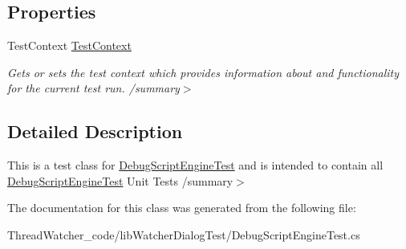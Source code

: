 \subsection*{Properties}
\begin{DoxyCompactItemize}
\item 
\hypertarget{classlib_watcher_dialog_test_1_1_debug_script_engine_test_ada71d963cf0149de6a70d39e3e203f13}{Test\+Context \hyperlink{classlib_watcher_dialog_test_1_1_debug_script_engine_test_ada71d963cf0149de6a70d39e3e203f13}{Test\+Context}}\label{classlib_watcher_dialog_test_1_1_debug_script_engine_test_ada71d963cf0149de6a70d39e3e203f13}

\begin{DoxyCompactList}\small\item\em Gets or sets the test context which provides information about and functionality for the current test run. /summary$>$ \end{DoxyCompactList}\end{DoxyCompactItemize}


\subsection{Detailed Description}
This is a test class for \hyperlink{classlib_watcher_dialog_test_1_1_debug_script_engine_test}{Debug\+Script\+Engine\+Test} and is intended to contain all \hyperlink{classlib_watcher_dialog_test_1_1_debug_script_engine_test}{Debug\+Script\+Engine\+Test} Unit Tests /summary$>$ 

The documentation for this class was generated from the following file\+:\begin{DoxyCompactItemize}
\item 
Thread\+Watcher\+\_\+code/lib\+Watcher\+Dialog\+Test/Debug\+Script\+Engine\+Test.\+cs\end{DoxyCompactItemize}
